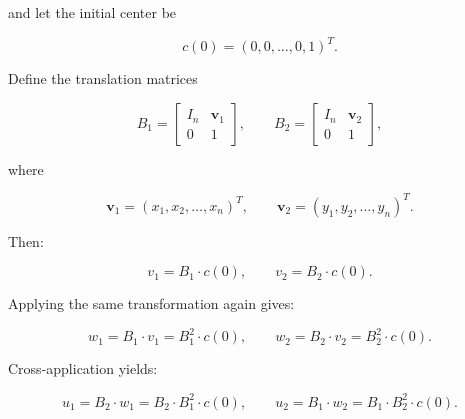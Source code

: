\documentclass[11pt,a4paper]{article}
\theoremstyle{plain}
\theoremstyle{definition}
\begin{document}
\vspace{0.5em}

and let the initial center be

\vspace{0.5em}

\[
c(0) = (0,0,\ldots,0,1)^T.
\]

\vspace{0.5em}

Define the translation matrices

\vspace{0.5em}

\[
B_1 =
\begin{bmatrix}
I_n & \mathbf{v}_1 \\
0 & 1
\end{bmatrix},
\qquad
B_2 =
\begin{bmatrix}
I_n & \mathbf{v}_2 \\
0 & 1
\end{bmatrix},
\]

\vspace{0.5em}

where

\vspace{0.5em}

\[
\mathbf{v}_1 = (x_1, x_2, \ldots, x_n)^T,
\qquad
\mathbf{v}_2 = (y_1, y_2, \ldots, y_n)^T.
\]

\vspace{0.5em}

Then:

\vspace{0.5em}

\[
v_1 = B_1 \cdot c(0),\qquad v_2 = B_2 \cdot c(0).
\]

\vspace{0.5em}

Applying the same transformation again gives:

\vspace{0.5em}

\[
w_1 = B_1 \cdot v_1 = B_1^2 \cdot c(0),
\qquad
w_2 = B_2 \cdot v_2 = B_2^2 \cdot c(0).
\]

\vspace{0.5em}

Cross-application yields:

\vspace{0.5em}

\[
u_1 = B_2 \cdot w_1 = B_2 \cdot B_1^2 \cdot c(0),
\qquad
u_2 = B_1 \cdot w_2 = B_1 \cdot B_2^2 \cdot c(0).
\]

\vspace{0.5em}
\end{document}

